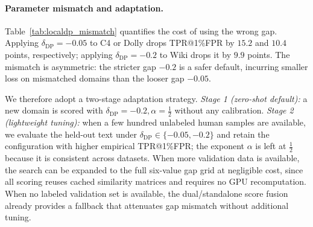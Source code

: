 \paragraph{Parameter mismatch and adaptation.}
Table~\ref{tab:localdp_mismatch} quantifies the cost of using the wrong gap.
Applying $\delta_{\mathrm{DP}}=-0.05$ to C4 or Dolly drops TPR@1\%FPR by
$15.2$ and $10.4$ points, respectively; applying $\delta_{\mathrm{DP}}=-0.2$
to Wiki drops it by $9.9$ points. The mismatch is asymmetric: the stricter
gap $-0.2$ is a safer default, incurring smaller loss on mismatched domains
than the looser gap $-0.05$.

We therefore adopt a two-stage adaptation strategy.
\textit{Stage 1 (zero-shot default):} a new domain is scored with
$\delta_{\mathrm{DP}}=-0.2, \alpha=\tfrac12$ without any calibration.
\textit{Stage 2 (lightweight tuning):} when a few hundred unlabeled human
samples are available, we evaluate the held-out text under
$\delta_{\mathrm{DP}} \in \{-0.05, -0.2\}$ and retain the configuration with
higher empirical TPR@1\%FPR; the exponent $\alpha$ is left at
$\tfrac12$ because it is consistent across datasets. When more validation
data is available, the search can be expanded to the full six-value gap grid
at negligible cost, since all scoring reuses cached similarity matrices and
requires no GPU recomputation. When no labeled validation set is available,
the dual/standalone score fusion already provides a fallback that attenuates
gap mismatch without additional tuning.
